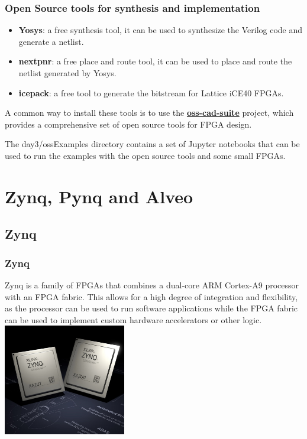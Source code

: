 \documentclass{beamer}
\begin{document}
\begin{frame}\frametitle{Open Source tools for synthesis and implementation}

\begin{itemize}
	\item \textbf{Yosys}: a free synthesis tool, it can be used to synthesize the Verilog code and generate a netlist.
	\vspace{0.3cm}
	\item \textbf{nextpnr}: a free place and route tool, it can be used to place and route the netlist generated by Yosys.
	\vspace{0.3cm}
	\item \textbf{icepack}: a free tool to generate the bitstream for Lattice iCE40 FPGAs.
\end{itemize}

\vspace{0.3cm}

A common way to install these tools is to use the
\href{https://github.com/YosysHQ/oss-cad-suite-build/}{
\textbf{oss-cad-suite}} project, which provides
a comprehensive set of open source tools for FPGA design.

\vspace{0.3cm}
The day3/ossExamples directory contains a set of
Jupyter notebooks that can be used to run the examples
with the open source tools and some small FPGAs.

\end{frame}

\section{Zynq, Pynq and Alveo}

\subsection{Zynq}

\begin{frame}\frametitle{Zynq}
Zynq is a family of FPGAs that combines a dual-core ARM Cortex-A9
processor with an FPGA fabric. This allows for a high degree of
integration and flexibility, as the processor can be used to run
software applications while the FPGA fabric can be used to implement
custom hardware accelerators or other logic. \\
\vspace{0.5cm}
\centering
\includegraphics[width=0.4\textwidth]{zynq.jpg}
\end{frame}
\end{document}
